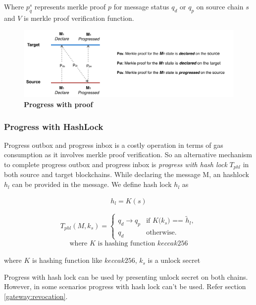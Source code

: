\documentclass[12pt,a4paper]{article}
\begin{document}
Where $p^s_{q}$ represents merkle proof $p$ for message status $q_d$ or $q_p$ on source chain $s$  and $V$ is merkle proof verification function.

\begin{figure}[htb]
    \centering
	\includegraphics[width=\textwidth]{progress_with_proof}
	\caption{\textbf{Progress with proof}}
	\label{fig:progress_with_proof}
\end{figure}

\subsubsection{Progress with HashLock}\label{gateway:progresshashlock} 

Progress outbox  and progress inbox is a costly operation in terms of gas consumption as it involves merkle proof verification. 
So an alternative mechanism to complete progress outbox and progress inbox is \emph{progress with hash lock} $T_{phl}$  in both source and target blockchains. 
While declaring the message M, an hashlock $h_l$ can be provided in the message. We define hash lock $h_l$ as

\begin{align}
	h_l = K(s)
\end{align}

\begin{equation*}
T_{phl}(M,k_s)=\begin{cases}
q_d \rightarrow q_p & \text{if $K$($k_s$) == $\tilde{h}_l$},\\
q_d& \text{otherwise}.
\end{cases}
\end{equation*}
\begin{align*}
\text{where $K$ is hashing function $keccak256$}
\end{align*}

where $K$ is hashing function like $keccak256$, $k_s$ is a unlock secret 

Progress with hash lock can be used by presenting unlock secret on both chains. However, in some scenarios progress with hash lock can't be used. Refer section \ref{gateway:revocation}.
\end{document}
